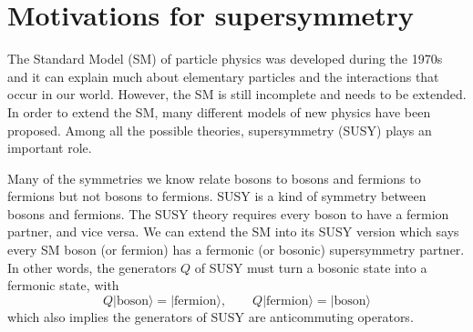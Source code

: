 \documentclass[12pt]{report}
\begin{document}
\chapter{Motivations for supersymmetry}
The Standard Model (SM) of particle physics was developed during the 1970s and it can explain much about elementary particles and the interactions that occur in our world.
However, the SM is still incomplete and needs to be extended.
In order to extend the SM, many different models of new physics have been proposed.
Among all the possible theories, supersymmetry (SUSY) \cite{wess_and_zumino} plays an important role.

Many of the symmetries we know relate bosons to bosons and fermions to fermions but not bosons to fermions.
SUSY is a kind of symmetry between bosons and fermions.
The SUSY theory requires every boson to have a fermion partner, and vice versa.
We can extend the SM into its SUSY version which says every SM boson (or fermion) has a fermonic (or bosonic) supersymmetry partner.
In other words, the generators $Q$ of SUSY must turn a bosonic state into a fermonic state, with
\begin{equation}
Q|\mathrm{boson}\rangle = |\mathrm{fermion}\rangle, \qquad 
Q|\mathrm{fermion}\rangle = |\mathrm{boson}\rangle
\end{equation}
which also implies the generators of SUSY are anticommuting operators.
\end{document}
